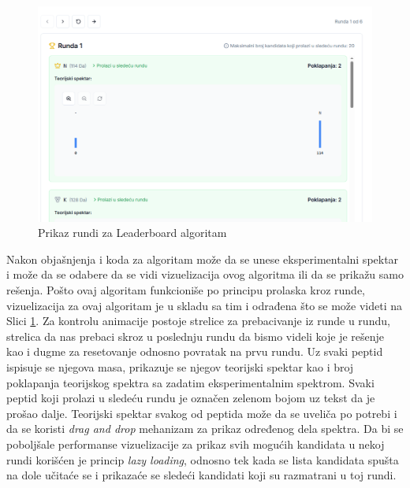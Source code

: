 \documentclass[12pt,oneside]{memoir}
\begin{document}
\begin{figure}[h]
\centering
\includegraphics[width=1\textwidth,height=0.4\textheight]{images/leaderboard_2.png}
\caption{Prikaz rundi za Leaderboard algoritam}
\label{fig:leaderboard_2}
\end{figure}

Nakon objašnjenja i koda za algoritam može da se unese eksperimentalni spektar i može da se odabere da se vidi vizuelizacija ovog algoritma ili da se prikažu samo rešenja. Pošto ovaj algoritam funkcioniše po principu prolaska kroz runde, vizuelizacija za ovaj algoritam je u skladu sa tim i odrađena što se može videti na Slici \ref{fig:leaderboard_2}. Za kontrolu animacije postoje strelice za prebacivanje iz runde u rundu, strelica da nas prebaci skroz u poslednju rundu da bismo videli koje je rešenje kao i dugme za resetovanje odnosno povratak na prvu rundu. Uz svaki peptid ispisuje se njegova masa, prikazuje se njegov teorijski spektar kao i broj poklapanja teorijskog spektra sa zadatim eksperimentalnim spektrom. Svaki peptid koji prolazi u sledeću rundu je označen zelenom bojom uz tekst da je prošao dalje.
Teorijski spektar svakog od peptida može da se uveliča po potrebi i da se koristi \emph{drag and drop} mehanizam za prikaz određenog dela spektra.
Da bi se poboljšale performanse vizuelizacije za prikaz svih mogućih kandidata u nekoj rundi korišćen je princip \emph{lazy loading}, odnosno tek kada se lista kandidata spušta na dole učitaće se i prikazaće se sledeći kandidati koji su razmatrani u toj rundi.
\end{document}
